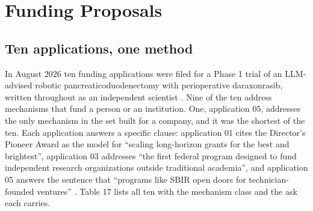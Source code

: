 \section{Funding Proposals}
\label{sec:funding}

\subsection{Ten applications, one method}

In August 2026 ten funding applications were filed for a Phase 1 trial of an
LLM-advised robotic pancreaticoduodenectomy with perioperative daraxonrasib,
written throughout as an independent scientist \cite{tenapps2026}. Nine of the
ten address mechanisms that fund a person or an institution. One, application
05, addresses the only mechanism in the set built for a company, and it was the
shortest of the ten. Each application answers a specific clause: application 01
cites the Director's Pioneer Award as the model for ``scaling long-horizon
grants for the best and brightest'', application 03 addresses ``the first
federal program designed to fund independent research organizations outside
traditional academia'', and application 05 answers the sentence that
``programs like SBIR open doors for technician-founded ventures''
\cite{tenapps2026, kratsios2026sciencegoldenage}. Table 17 lists all ten with
the mechanism class and the ask each carries.

